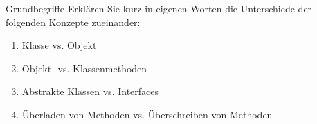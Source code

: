 \documentclass{../preamble}
\date{07.12.2020 - 11.12.2020}
\begin{document}
\maketitle

\makedisclaimer

\clearpage

\begin{task}[credit = \stars{0}{3}]{Grundbegriffe}
    Erklären Sie kurz in eigenen Worten die Unterschiede der folgenden Konzepte zueinander:
    \begin{enumerate}
        \item Klasse vs. Objekt
        \item Objekt- vs. Klassenmethoden
        \item Abstrakte Klassen vs. Interfaces
        \item Überladen von Methoden vs. Überschreiben von Methoden
    \end{enumerate}


\end{task}
\end{document}
